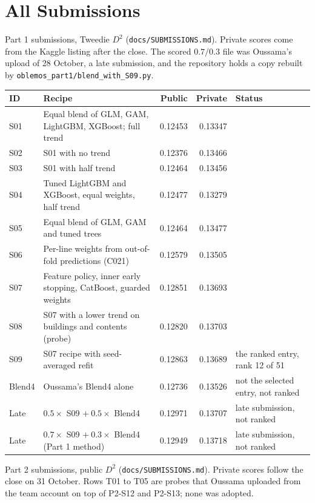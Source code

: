 \documentclass{rapport}
\begin{document}
\clearpage
\section{All Submissions}
\label{ov:app-sub}

Part 1 submissions, Tweedie $D^2$ (\texttt{docs/SUBMISSIONS.md}). Private scores come from the Kaggle listing after the
close. The scored $0.7/0.3$ file was Oussama's upload of 28 October, a late submission, and the repository holds a
copy rebuilt by
\texttt{oblemos\_part1/blend\_with\_S09.py}.

\begin{center}
\small
\begin{tabular}{lp{5.2cm}rrp{3.4cm}}
\hline
ID & Recipe & Public & Private & Status\\
\hline
S01 & Equal blend of GLM, GAM, LightGBM, XGBoost; full trend & 0.12453 & 0.13347 & \\
S02 & S01 with no trend & 0.12376 & 0.13466 & \\
S03 & S01 with half trend & 0.12464 & 0.13456 & \\
S04 & Tuned LightGBM and XGBoost, equal weights, half trend & 0.12477 & 0.13279 & \\
S05 & Equal blend of GLM, GAM and tuned trees & 0.12464 & 0.13477 & \\
S06 & Per-line weights from out-of-fold predictions (C021) & 0.12579 & 0.13505 & \\
S07 & Feature policy, inner early stopping, CatBoost, guarded weights & 0.12851 & 0.13693 & \\
S08 & S07 with a lower trend on buildings and contents (probe) & 0.12820 & 0.13703 & \\
S09 & S07 recipe with seed-averaged refit & 0.12863 & 0.13689 & the ranked entry, rank 12 of 51\\
Blend4 & Oussama's Blend4 alone & 0.12736 & 0.13526 & not the selected entry, not ranked\\
Late & $0.5\times$ S09 $+\ 0.5\times$ Blend4 & 0.12971 & 0.13707 & late submission, not ranked\\
Late & $0.7\times$ S09 $+\ 0.3\times$ Blend4 (Part 1 method) & 0.12949 & 0.13718 & late submission, not ranked\\
\hline
\end{tabular}
\end{center}

Part 2 submissions, public $D^2$ (\texttt{docs/SUBMISSIONS.md}). Private scores follow the close on 31 October. Rows
T01 to T05 are probes that Oussama uploaded from the team account on top of P2-S12 and P2-S13; none was adopted.
\end{document}

